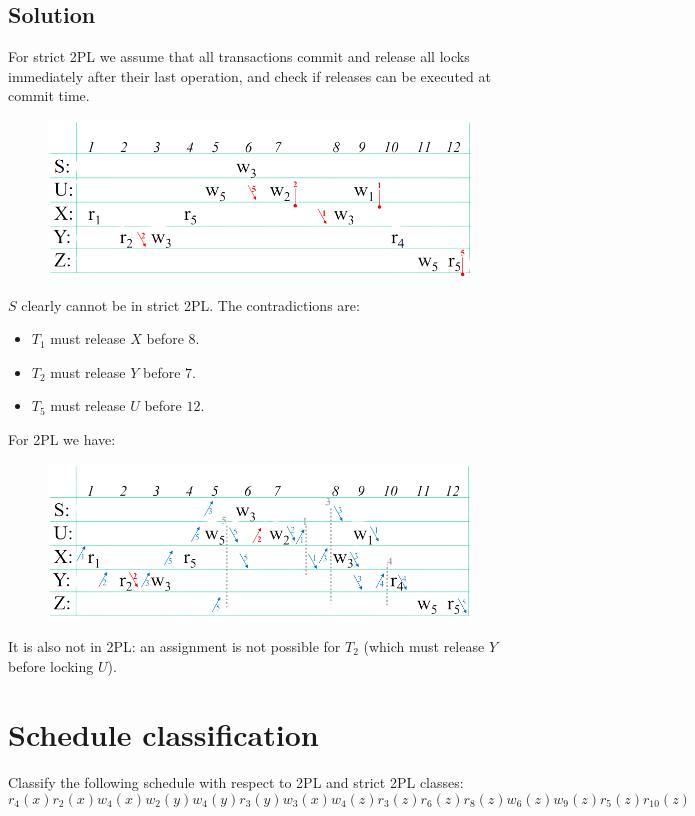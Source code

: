 \documentclass[12pt, a4paper]{report}
\newtheorem[style=M,bodystyle=\normalfont]{theorem}{Theorem}
\newtheorem[style=M,bodystyle=\normalfont]{corollary}{Corollary}
\newtheorem[style=M,bodystyle=\normalfont]{lemma}{Lemma}
\newtheorem[style=M,bodystyle=\normalfont]{definition}{Definition}
\begin{document}
    \subsection*{Solution}
        For strict 2PL we assume that all transactions commit and release all locks immediately after their last operation, and check if releases can be executed at commit time.
        \begin{figure}[H]
            \centering
            \includegraphics[width=1\linewidth]{images/2PL1.png}
        \end{figure}
        $S$ clearly cannot be in strict 2PL. The contradictions are:
        \begin{itemize}
            \item $T_1$ must release $X$ before $8$. 
            \item $T_2$ must release $Y$ before $7$.
            \item $T_5$ must release $U$ before $12$.
        \end{itemize}
        For 2PL we have: 
        \begin{figure}[H]
            \centering
            \includegraphics[width=1\linewidth]{images/2PL2.png}
        \end{figure}
        It is also not in 2PL: an assignment is not possible for $T_2$ (which must release $Y$ before locking $U$).

    \newpage

    \section{Schedule classification}
        Classify the following schedule with respect to 2PL and strict 2PL classes: 
        \[r_4(x) r_2(x) w_4(x) w_2(y) w_4(y) r_3(y) w_3(x) w_4(z) r_3(z) r_6(z) r_8(z) w_6(z) w_9(z) r_5(z) r_10(z)\]
\end{document}
